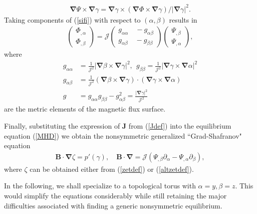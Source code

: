 \documentclass[aip,pop,reprint]{revtex4-1}
\newcommand*{\B}{\bm{B}}
\newcommand*{\J}{\bm{J}}
\newcommand*{\Jac}{\mathscr{J}}
\newcommand*{\dl}{\bm{\nabla}}
\begin{document}
\begin{align}
\dl \Psi \times \dl \gamma =  \dl \gamma \times (\dl \Phi\times \dl \gamma)/|\dl \gamma|^2. \label{sifi}
\end{align}
Taking components of (\ref{sifi}) with respect to $(\alpha,\beta)$  results in
\begin{align}
\begin{pmatrix}
\Phi_{,\alpha}\\ \Phi_{,\beta}
\end{pmatrix}=\Jac
\begin{pmatrix}
g_{\alpha\alpha} \quad -g_{\alpha\beta}\\ 
g_{\alpha\beta} \quad -g_{\beta\beta}
\end{pmatrix}
\begin{pmatrix}
\Psi_{,\beta}\\ \Psi_{,\alpha}
\end{pmatrix},
\label{sifimatrix}
\end{align}
where
\begin{subequations}
\begin{align}
g_{\alpha\alpha}&=\frac{1}{\Jac^{2}}|\dl\beta\times\dl \gamma|^2,\:\: g_{\beta\beta}=\frac{1}{\Jac^{2}}|\dl\gamma\times\dl\alpha |^2 \\
g_{\alpha\beta}&=\frac{1}{\Jac^{2}}(\dl\beta\times\dl \gamma)\cdot (\dl\gamma\times\dl\alpha )\label{gmetric}\\
g &=g_{\alpha\alpha}g_{\beta\beta}-g_{\alpha\beta}^2=\frac{|\dl \gamma|^2}{\Jac^2}
\end{align}
\end{subequations}
are the metric elements of the magnetic flux surface.

Finally, substituting the expression of $\J$ from (\ref{Jdef}) into the equilibrium equation (\ref{MHD}) we obtain %
the nonsymmetric generalized ``Grad-Shafranov" equation
\begin{align}
\B\cdot \dl \zeta= p'(\gamma), \quad \B\cdot \dl =\Jac(\Psi_{,\beta}\partial_\alpha - \Psi_{,\alpha}\partial_\beta ), \label{GS0}
\end{align}
where $\zeta$ can be obtained either from (\ref{zetdef}) or (\ref{altzetdef}).

 In the following, we shall specialize to a topological torus with $\alpha=y, \beta =z$. This would simplify the equations considerably while still retaining the major difficulties associated with finding a generic nonsymmetric equilibrium.
 
\end{document}
